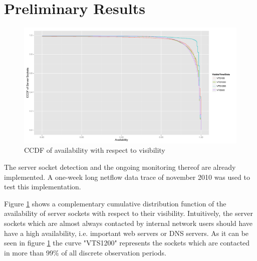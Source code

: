 \documentclass{sigcomm-alternate}
\begin{document}
\section{Preliminary Results}
\begin{figure}[ht!]
\centering
\includegraphics[width=18cm]{images/RATIO_VTS_External.pdf}
\caption{CCDF of availability with respect to visibility}
\label{fig:RatioVTS}
\end{figure}
The server socket detection and the ongoing monitoring thereof are already implemented. A one-week long netflow data trace of november 2010 was used to test this implementation. 

Figure \ref{fig:RatioVTS} shows a complementary cumulative distribution function of the availability of server sockets with respect to their visibility. Intuitively, the server sockets which are almost always contacted by internal network users should have have a high availability, i.e. important web servers or DNS servers. As it can be seen in figure \ref{fig:RatioVTS} the curve "VTS1200" represents the sockets which are contacted in more than $99\%$ of all discrete observation periods. 


 
% 

\end{document}
